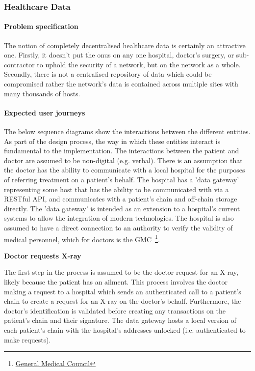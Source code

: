\subsubsection{Healthcare Data}

\paragraph{Problem specification}

The notion of completely decentralised healthcare data is certainly an attractive one. Firstly, it doesn't put the onus on any one hospital, doctor's surgery, or sub-contractor to uphold the security of a network, but on the network as a whole. Secondly, there is not a centralised repository of data which could be compromised rather the network's data is contained across multiple sites with many thousands of hosts.

\paragraph{Expected user journeys}

The below sequence diagrams show the interactions between the different entities. As part of the design process, the way in which these entities interact is fundamental to the implementation. The interactions between the patient and doctor are assumed to be non-digital (e.g. verbal). There is an assumption that the doctor has the ability to communicate with a local hospital for the purposes of referring treatment on a patient's behalf. The hospital has a 'data gateway' representing some host that has the ability to be communicated with via a RESTful API, and communicates with a patient's chain and off-chain storage directly. The 'data gateway' is intended as an extension to a hospital's current systems to allow the integration of modern technologies. The hospital is also assumed to have a direct connection to an authority to verify the validity of medical personnel, which for doctors is the GMC~\footnote{\href{http://www.gmc-uk.org/}{General Medical Council}}.

\textbf{Doctor requests X-ray}

The first step in the process is assumed to be the doctor request for an X-ray, likely because the patient has an ailment. This process involves the doctor making a request to a hospital which sends an authenticated call to a patient's chain to create a request for an X-ray on the doctor's behalf. Furthermore, the doctor's identification is validated before creating any transactions on the patient's chain and their signature. The data gateway hosts a local version of each patient's chain with the hospital's addresses unlocked (i.e. authenticated to make requests).

